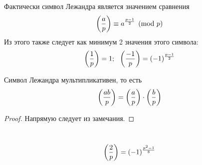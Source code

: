 \begin{note}
	Фактически символ Лежандра является значением сравнения
	\[
		\left(\frac{ a }{ p }\right) \equiv a^{\frac{p - 1}{2}} \pmod p
	\]
	Из этого также следует как минимум 2 значения этого символа:
	\[
		\left(\frac{ 1 }{ p }\right) = 1;\ \ \left(\frac{ -1 }{ p }\right) = (-1)^{\frac{p - 1}{2}}
	\]
\end{note}

\begin{proposition}
	Символ Лежандра мультипликативен, то есть
	\[
		\left(\frac{ ab }{ p }\right) = \left(\frac{ a }{ p }\right) \cdot \left(\frac{ b }{ p }\right)
	\]
\end{proposition}

\begin{proof}
	Напрямую следует из замечания.
\end{proof}

\begin{theorem}~
	\[
		\left(\frac{ 2 }{ p }\right) = (-1)^{\frac{p^2 - 1}{8}}
	\]
\end{theorem}

